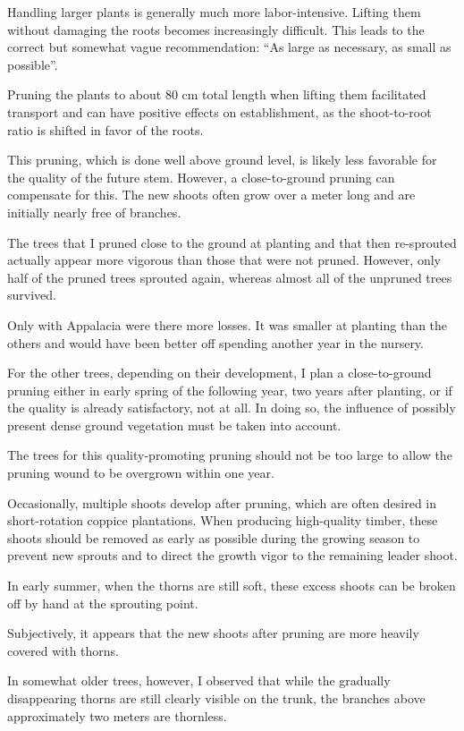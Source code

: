 Handling larger plants is generally much more labor-intensive. Lifting them without damaging the roots becomes increasingly difficult. This leads to the correct but somewhat vague recommendation: \enquote{As large as necessary, as small as possible}.

Pruning the plants to about 80 cm total length when lifting them facilitated transport and can have positive effects on establishment, as the shoot-to-root ratio is shifted in favor of the roots.

This pruning, which is done well above ground level, is likely less favorable for the quality of the future stem. However, a close-to-ground pruning can compensate for this. The new shoots often grow over a meter long and are initially nearly free of branches.

The trees that I pruned close to the ground at planting and that then re-sprouted actually appear more vigorous than those that were not pruned. However, only half of the pruned trees sprouted again, whereas almost all of the unpruned trees survived.

Only with Appalacia were there more losses. It was smaller at planting than the others and would have been better off spending another year in the nursery.

For the other trees, depending on their development, I plan a close-to-ground pruning either in early spring of the following year, two years after planting, or if the quality is already satisfactory, not at all. In doing so, the influence of possibly present dense ground vegetation must be taken into account.

The trees for this quality-promoting pruning should not be too large to allow the pruning wound to be overgrown within one year.

Occasionally, multiple shoots develop after pruning, which are often desired in short-rotation coppice plantations. When producing high-quality timber, these shoots should be removed as early as possible during the growing season to prevent new sprouts and to direct the growth vigor to the remaining leader shoot.

In early summer, when the thorns are still soft, these excess shoots can be broken off by hand at the sprouting point.

Subjectively, it appears that the new shoots after pruning are more heavily covered with thorns.

In somewhat older trees, however, I observed that while the gradually disappearing thorns are still clearly visible on the trunk, the branches above approximately two meters are thornless.

